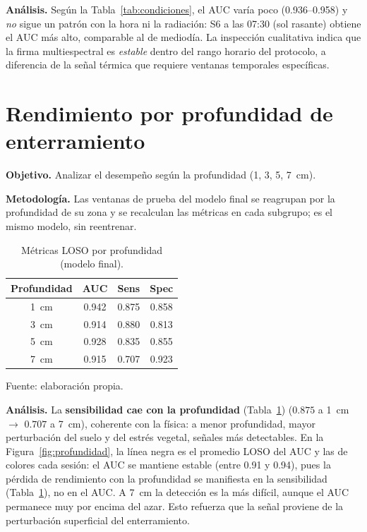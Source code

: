 \textbf{Análisis.} Según la Tabla~\ref{tab:condiciones}, el \ac{AUC} varía poco (0.936--0.958) y \emph{no} sigue un
patrón con la hora ni la radiación: S6 a las 07:30 (sol rasante) obtiene el
\ac{AUC} más alto, comparable al de mediodía. La inspección cualitativa indica
que la firma multiespectral es \emph{estable} dentro del rango
horario del protocolo, a diferencia de la señal térmica que requiere ventanas
temporales específicas.

\section{Rendimiento por profundidad de enterramiento}
\label{sec:profundidad}

\textbf{Objetivo.} Analizar el desempeño según la profundidad (1, 3, 5, 7~cm).

\textbf{Metodología.} Las ventanas de prueba del modelo final se reagrupan por la
profundidad de su zona y se recalculan las métricas en cada subgrupo; es el mismo
modelo, sin reentrenar.

\begin{table}[H]
\centering
\caption{Métricas \ac{LOSO} por profundidad (modelo final).}
\label{tab:profundidad}
\small
\begin{tabular}{cccc}
\toprule
\textbf{Profundidad} & \textbf{AUC} & \textbf{Sens} & \textbf{Spec} \\
\midrule
\SI{1}{cm} & 0.942 & 0.875 & 0.858 \\
\SI{3}{cm} & 0.914 & 0.880 & 0.813 \\
\SI{5}{cm} & 0.928 & 0.835 & 0.855 \\
\SI{7}{cm} & 0.915 & 0.707 & 0.923 \\
\bottomrule
\end{tabular}

  {\footnotesize Fuente: elaboración propia.}
\end{table}

\textbf{Análisis.} La \textbf{sensibilidad cae con la profundidad} (Tabla~\ref{tab:profundidad})
($0.875$ a \SI{1}{cm} $\to$ $0.707$ a \SI{7}{cm}), coherente con la física: a
menor profundidad, mayor perturbación del suelo y del estrés vegetal, señales más
detectables. En la Figura~\ref{fig:profundidad}, la línea negra es el promedio
\ac{LOSO} del \ac{AUC} y las de colores cada sesión: el \ac{AUC} se mantiene estable
(entre 0.91 y 0.94), pues la pérdida de rendimiento con la profundidad se manifiesta
en la sensibilidad (Tabla~\ref{tab:profundidad}), no en el \ac{AUC}. A \SI{7}{cm} la detección es la más
difícil, aunque el \ac{AUC} permanece muy por encima del azar. Esto refuerza que
la señal proviene de la perturbación superficial del enterramiento.

